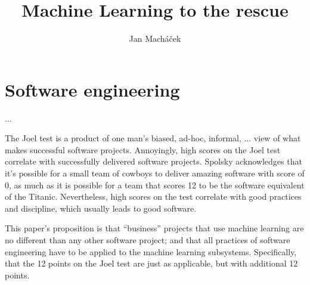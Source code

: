 



\title{Machine Learning to the rescue}

\author{Jan Macháček}

\newcommand{\joel}[1]{\\ \emph{Joel: #1}}




\section{Software engineering}
...

The Joel test\cite{joeltest} is a product of one man's biased, ad-hoc, informal, ... view of what makes successful software projects. Annoyingly, high scores on the Joel test correlate with successfully delivered software projects. Spolsky acknowledges that it's possible for a small team of cowboys to deliver amazing software with score of 0, as much as it is possible for a team that scores 12 to be the software equivalent of the Titanic. Nevertheless, high scores on the test correlate with good practices and discipline, which usually leads to good software.

This paper's proposition is that ``business'' projects that use machine learning are no different than any other software project; and that all practices of software engineering have to be applied to the machine learning subsystems. Specifically, that the 12 points on the Joel test are just as applicable, but with additional 12 points. 

